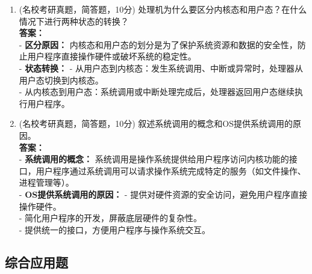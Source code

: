 \documentclass[lang=cn,newtx,10pt,scheme=chinese]{../../elegantbook}
\begin{document}
\begin{enumerate}
    \item (名校考研真题，简答题，10分) 处理机为什么要区分内核态和用户态？在什么情况下进行两种状态的转换？\\
    \textbf{答案：}\\
    - \textbf{区分原因：} 内核态和用户态的划分是为了保护系统资源和数据的安全性，防止用户程序直接操作硬件或破坏系统的稳定性。\\
    - \textbf{状态转换：}
        - 从用户态到内核态：发生系统调用、中断或异常时，处理器从用户态切换到内核态。\\
        - 从内核态到用户态：系统调用或中断处理完成后，处理器返回用户态继续执行用户程序。\\
    
    \item (名校考研真题，简答题，10分) 叙述系统调用的概念和OS提供系统调用的原因。\\
    \textbf{答案：}\\
    - \textbf{系统调用的概念：} 系统调用是操作系统提供给用户程序访问内核功能的接口，用户程序通过系统调用可以请求操作系统完成特定的服务（如文件操作、进程管理等）。\\
    - \textbf{OS提供系统调用的原因：}
        - 提供对硬件资源的安全访问，避免用户程序直接操作硬件。\\
        - 简化用户程序的开发，屏蔽底层硬件的复杂性。\\
        - 提供统一的接口，方便用户程序与操作系统交互。\\
\end{enumerate}
\subsection{综合应用题}
\end{document}
